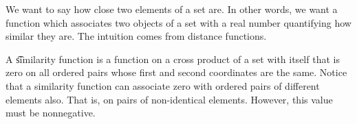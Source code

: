 
\sbasic




















\sstart
{}


We want to say how close two elements of a set are.
In other words, we want a function which associates two objects of a set with a real number quantifying how similar they are.
The intuition comes from distance functions.


A \t{similarity function} is a function on a cross product of a set with itself that is zero on all ordered pairs whose first and second coordinates are the same.
Notice that a similarity function can associate zero with ordered pairs of different elements also.
That is, on pairs of non-identical elements.
However, this value must be nonnegative.
\strats
